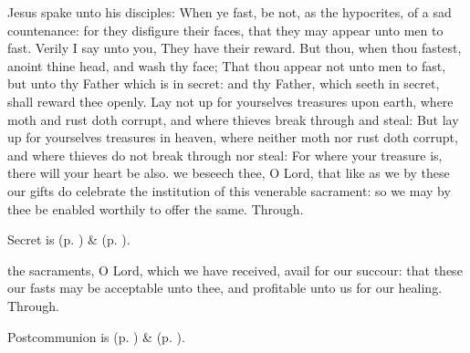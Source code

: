  Jesus spake unto his disciples: When ye fast, be not, as the hypocrites, of a sad countenance: for they disfigure their faces, that they may appear unto men to fast. Verily I say unto you, They have their reward. But thou, when thou fastest, anoint thine head, and wash thy face; That thou appear not unto men to fast, but unto thy Father which is in secret: and thy Father, which seeth in secret, shall reward thee openly. Lay not up for yourselves treasures upon earth, where moth and rust doth corrupt, and where thieves break through and steal: But lay up for yourselves treasures in heaven, where neither moth nor rust doth corrupt, and where thieves do not break through nor steal: For where your treasure is, there will your heart be also.
\secret\label{AshWednesdayMassSecret}
 we beseech thee, O Lord, that like as we by these our gifts do celebrate the institution of this venerable sacrament: so we may by thee be enabled worthily to offer the same. Through.
\begin{rubric}
     Secret is  (p. \pageref{SPSaints}) \&   (p. \pageref{SPLivingDeparted}).
\end{rubric}
\postcommunion\label{AshWednesdayMassPostcommunion}
 the sacraments, O Lord, which we have received, avail for our succour: that these our fasts may be acceptable unto thee, and profitable unto us for our healing. Through.
\begin{rubric}
     Postcommunion is  (p. \pageref{SPSaints}) \&   (p. \pageref{SPLivingDeparted}).
\end{rubric}

